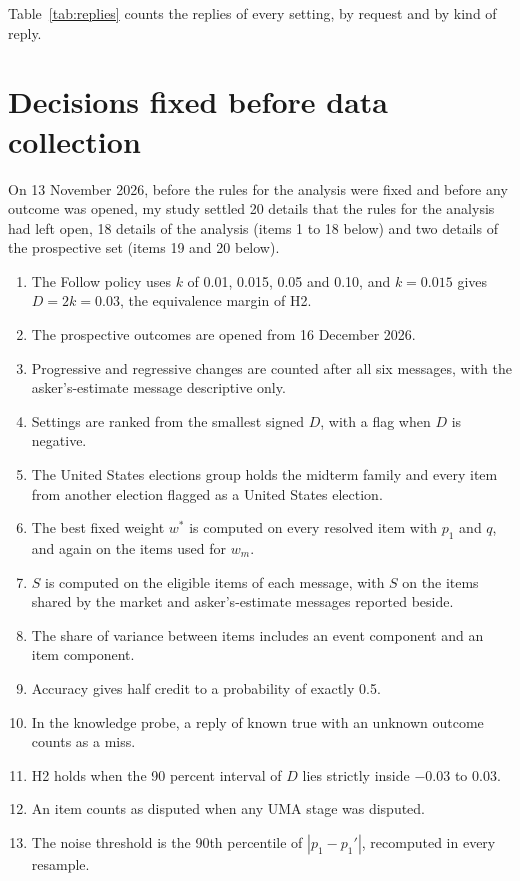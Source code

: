 \documentclass[11pt]{article}
\begin{document}
Table~\ref{tab:replies} counts the replies of every setting, by request and by kind of reply.



\section{Decisions fixed before data collection}\label{app:defaults}

On 13 November 2026, before the rules for the analysis were fixed and before any outcome was opened, my study settled 20 details that the rules for the analysis had left open, 18 details of the analysis (items 1 to 18 below) and two details of the prospective set (items 19 and 20 below).
\begin{enumerate}
\setlength{\itemsep}{0pt}
\item The Follow policy uses $k$ of 0.01, 0.015, 0.05 and 0.10, and $k=0.015$ gives $D=2k=0.03$, the equivalence margin of H2.
\item The prospective outcomes are opened from 16 December 2026.
\item Progressive and regressive changes are counted after all six messages, with the asker's-estimate message descriptive only.
\item Settings are ranked from the smallest signed $D$, with a flag when $D$ is negative.
\item The United States elections group holds the midterm family and every item from another election flagged as a United States election.
\item The best fixed weight $w^*$ is computed on every resolved item with $p_1$ and $q$, and again on the items used for $w_m$.
\item $S$ is computed on the eligible items of each message, with $S$ on the items shared by the market and asker's-estimate messages reported beside.
\item The share of variance between items includes an event component and an item component.
\item Accuracy gives half credit to a probability of exactly 0.5.
\item In the knowledge probe, a reply of known true with an unknown outcome counts as a miss.
\item H2 holds when the 90 percent interval of $D$ lies strictly inside $-$0.03 to 0.03.
\item An item counts as disputed when any UMA stage was disputed.
\item The noise threshold is the 90th percentile of $|p_1-p_1'|$, recomputed in every resample.

\end{enumerate}
\end{document}
